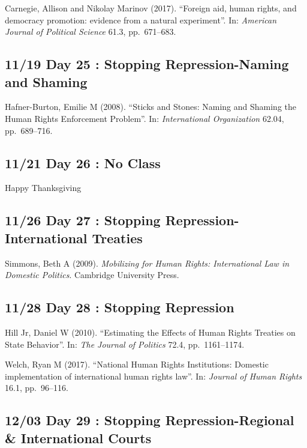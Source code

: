 \documentclass[11pt,]{article}
\begin{document}
Carnegie, Allison and Nikolay Marinov (2017). ``Foreign aid, human
rights, and democracy promotion: evidence from a natural experiment''.
In: \emph{American Journal of Political Science} 61.3, pp.~671--683.

\hypertarget{day-25-stopping-repression-naming-and-shaming}{%
\subsection{11/19 Day 25 : Stopping Repression-Naming and
Shaming}\label{day-25-stopping-repression-naming-and-shaming}}

Hafner-Burton, Emilie M (2008). ``Sticks and Stones: Naming and Shaming
the Human Rights Enforcement Problem''. In:
\emph{International Organization} 62.04, pp.~689--716.

\hypertarget{day-26-no-class}{%
\subsection{11/21 Day 26 : No Class}\label{day-26-no-class}}

Happy Thanksgiving

\hypertarget{day-27-stopping-repression-international-treaties}{%
\subsection{11/26 Day 27 : Stopping Repression-International
Treaties}\label{day-27-stopping-repression-international-treaties}}

Simmons, Beth A (2009).
\emph{Mobilizing for Human Rights: International Law in Domestic Politics}.
Cambridge University Press.

\hypertarget{day-28-stopping-repression}{%
\subsection{11/28 Day 28 : Stopping
Repression}\label{day-28-stopping-repression}}

Hill Jr, Daniel W (2010). ``Estimating the Effects of Human Rights
Treaties on State Behavior''. In: \emph{The Journal of Politics} 72.4,
pp.~1161--1174.

Welch, Ryan M (2017). ``National Human Rights Institutions: Domestic
implementation of international human rights law''. In:
\emph{Journal of Human Rights} 16.1, pp.~96--116.

\hypertarget{day-29-stopping-repression-regional-international-courts}{%
\subsection{12/03 Day 29 : Stopping Repression-Regional \& International
Courts}\label{day-29-stopping-repression-regional-international-courts}}
\end{document}
